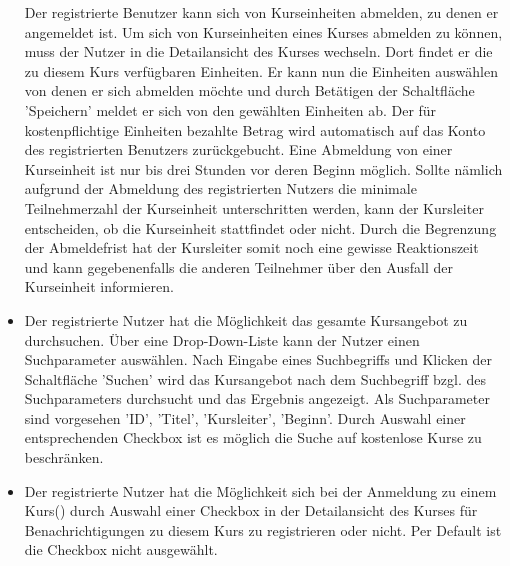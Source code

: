 \documentclass[a4paper]{scrreprt}
\begin{document}
\begin{itemize}
					Der registrierte Benutzer kann sich von Kurseinheiten abmelden, zu denen er angemeldet ist. Um sich von Kurseinheiten eines Kurses abmelden zu können, muss der Nutzer in die Detailansicht des Kurses wechseln. Dort findet er die zu diesem Kurs verfügbaren Einheiten.
					Er kann nun die Einheiten auswählen von denen er sich abmelden möchte und durch Betätigen der Schaltfläche 'Speichern' meldet er sich von den gewählten Einheiten ab. Der für kostenpflichtige Einheiten bezahlte Betrag wird automatisch auf das Konto des registrierten Benutzers zurückgebucht.
					Eine Abmeldung von einer Kurseinheit ist nur bis drei Stunden vor deren Beginn möglich. Sollte nämlich aufgrund der Abmeldung des registrierten Nutzers die minimale Teilnehmerzahl der Kurseinheit unterschritten werden, kann der Kursleiter entscheiden, ob die Kurseinheit stattfindet oder nicht. Durch die Begrenzung der Abmeldefrist hat der Kursleiter somit noch eine gewisse Reaktionszeit und kann gegebenenfalls die anderen Teilnehmer über den Ausfall der Kurseinheit informieren. 
				\item {}
					Der registrierte Nutzer hat die Möglichkeit das gesamte Kursangebot zu durchsuchen. Über eine Drop-Down-Liste kann der Nutzer einen Suchparameter auswählen. Nach Eingabe eines Suchbegriffs und Klicken der Schaltfläche 'Suchen' wird das Kursangebot nach dem Suchbegriff bzgl. des Suchparameters durchsucht und das Ergebnis angezeigt. 
					Als Suchparameter sind vorgesehen 'ID', 'Titel', 'Kursleiter', 'Beginn'. Durch Auswahl einer entsprechenden Checkbox ist es möglich die Suche auf kostenlose Kurse zu beschränken.
				\item {}
					Der registrierte Nutzer hat die Möglichkeit sich bei der Anmeldung zu einem Kurs() durch Auswahl einer Checkbox in der Detailansicht des Kurses für Benachrichtigungen zu diesem Kurs zu registrieren oder nicht. Per Default ist die Checkbox nicht ausgewählt.
			\end{itemize}
\end{document}

